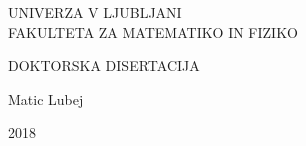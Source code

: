 \setcounter{page}{-1}
\begin{otherlanguage}{slovene}
\begin{center}
\pagestyle{empty}
{\large UNIVERZA V LJUBLJANI\\
FAKULTETA ZA MATEMATIKO IN FIZIKO
}

%
%
%

\vspace{10cm}
{\huge DOKTORSKA DISERTACIJA}



\vfill

{\hfill \large Matic Lubej}

\vspace{1cm}
{\large 2018}

\cleardoublepage

\end{center}
\end{otherlanguage}

